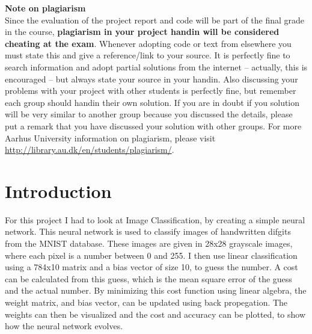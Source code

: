 \documentclass[a4paper,oneside,article]{memoir}
\begin{document}
\vfill
\noindent
\textbf{Note on plagiarism} 
\\[2ex]
Since the evaluation of the project report and code will be part of the final grade in the course, \textbf{plagiarism in your project handin will be considered cheating at the exam}. Whenever adopting code or text from elsewhere you must state this and give a reference/link to your source. It is perfectly fine to search information and adopt partial solutions from the internet -- actually, this is encouraged -- but always state your source in your handin. Also discussing your problems with your project with other students is perfectly fine, but remember each group should handin their own solution. If you are in doubt if you solution will be very similar to another group because you discussed the details, please put a remark that you have discussed your solution with other groups. For more Aarhus University information on plagiarism, please visit \url{http://library.au.dk/en/students/plagiarism/}.

\pagestyle{Title}
{}

\newpage


\chapter{Introduction }
For this project I had to look at Image Classification, by creating a simple neural network. 
This neural network is used to classify images of handwritten difgits from the MNIST database. 
These images are given in 28x28 grayscale images, where each pixel is a number between 0 and 255. 
I then use linear classification using a 784x10 matrix and a bias vector of size 10, to guess the number. 
A cost can be calculated from this guess, which is the mean square error of the guess and the actual number.
By minimizing this cost function using linear algebra, the weight matrix, and bias vector, can be updated using back propegation. 
The weights can then be visualized and the cost and accuracy can be plotted, to show how the neural network evolves. 
\end{document}
